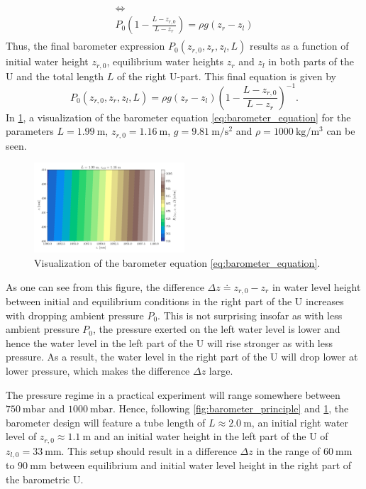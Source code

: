 \documentclass[a4paper,11pt, twocolumn]{article}
\begin{document}
\begin{gather}
\begin{gathered}
	\Leftrightarrow \\
	P_0\left(1 - \frac{L-z_{r,0}}{L-z_{r}}\right) = \rho g(z_r - z_l)
\end{gathered}
\end{gather} Thus, the final barometer expression $P_0(z_{r,0}, z_r, z_l, L)$ results as a function of initial water height $z_{r,0}$, equilibrium water heights $z_r$ and $z_l$ in both parts of the U and the total length $L$ of the right U-part. This final equation is given by \begin{equation}\label{eq:barometer_equation}
P_0(z_{r,0}, z_r, z_l, L) = \rho g(z_r-z_l)\left(1-\frac{L-z_{r,0}}{L-z_{r}}\right)^{-1}.
\end{equation}
In \cref{fig:colormap_theory}, a visualization of the barometer equation \cref{eq:barometer_equation} for the parameters $L = \SI{1.99}{\meter}$, $z_{r,0} = \SI{1.16}{\meter}$, $g = \SI{9.81}{\meter\per\second\squared}$ and $\rho = \SI{1000}{\kilogram\per\cubic\meter}$ can be seen.
\begin{figure}[h]
	\centering
	\includegraphics[width=0.5\textwidth]{figures/colormap_theory.pdf}
	\caption{Visualization of the barometer equation \cref{eq:barometer_equation}.}
	\label{fig:colormap_theory}
\end{figure}
As one can see from this figure, the difference $\Delta z \doteq z_{r,0}-z_r$ in water level height between initial and equilibrium conditions in the right part of the U increases with dropping ambient pressure $P_0$. This is not surprising insofar as with less ambient pressure $P_0$, the pressure exerted on the left water level is lower and hence the water level in the left part of the U will rise stronger as with less pressure. As a result, the water level in the right part of the U will drop lower at lower pressure, which makes the difference $\Delta z$ large.

The pressure regime in a practical experiment will range somewhere between $\SI{750}{\milli\bar}$ and $\SI{1000}{\milli\bar}$. Hence, following \cref{fig:barometer_principle} and \cref{fig:colormap_theory}, the barometer design will feature a tube length of $L \approx \SI{2.0}{\meter}$, an initial right water level of $z_{r,0} \approx \SI{1.1}{\meter}$ and an initial water height in the left part of the U of $z_{l,0} = \SI{33}{\milli\meter}$. This setup should result in a difference $\Delta z$ in the range of $\SI{60}{\milli\meter}$ to $\SI{90}{\milli\meter}$ between equilibrium and initial water level height in the right part of the barometric U.
\end{document}
